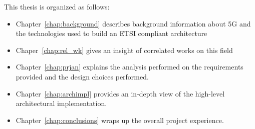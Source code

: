  This thesis is organized as follows:
 \begin{itemize}
  \item Chapter~\ref{chap:background} describes background information about 5G 
and the technologies used to build an ETSI compliant architecture
  \item Chaper~\ref{chap:rel_wk} gives an insight of correlated works on this 
field
  \item Chapter~\ref{chap:prjan} explains the analysis performed on the 
requirements provided and the design choices performed.
  \item Chapter~\ref{chap:archimpl} provides an in-depth view of the 
high-level architectural implementation.
  \item Chapter~\ref{chap:conclusions} wraps up the overall project experience.
 \end{itemize}

